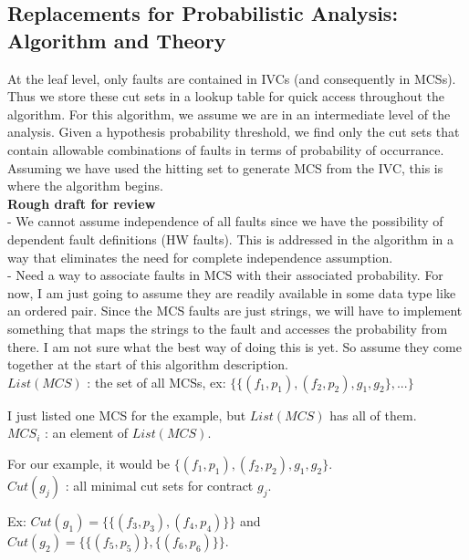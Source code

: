 \subsection{Replacements for Probabilistic Analysis: Algorithm and Theory}

At the leaf level, only faults are contained in IVCs (and consequently in MCSs). Thus we store these cut sets in a lookup table for quick access throughout the algorithm. For this algorithm, we assume we are in an intermediate level of the analysis. Given a hypothesis probability threshold, we find only the cut sets that contain allowable combinations of faults in terms of probability of occurrance.\\

Assuming we have used the hitting set to generate MCS from the IVC, this is where the algorithm begins. \\

\textbf{Rough draft for review}\\

- We cannot assume independence of all faults since we have the possibility of dependent fault definitions (HW faults). This is addressed in the algorithm in a way that eliminates the need for complete independence assumption. \\
- Need a way to associate faults in MCS with their associated probability. For now, I am just going to assume they are readily available in some data type like an ordered pair. Since the MCS faults are just strings, we will have to implement something that maps the strings to the fault and accesses the probability from there. I am not sure what the best way of doing this is yet. So assume they come together at the start of this algorithm description.\\

$List(MCS)$ : the set of all MCSs, ex: $\{\{(f_1,p_1),(f_2,p_2),g_1,g_2\}, ...\}$ 

I just listed one MCS for the example, but $List(MCS)$ has all of them. \\

$MCS_i$ : an element of $List(MCS)$. 

For our example, it would be $\{(f_1,p_1),(f_2,p_2),g_1,g_2\}$.\\

$Cut(g_j)$ : all minimal cut sets for contract $g_j$. 

Ex: $Cut(g_1) = \{\{(f_3,p_3),(f_4,p_4)\}\}$ and $Cut(g_2) = \{\{(f_5,p_5)\}, \{(f_6,p_6)\}\}$.    \\

